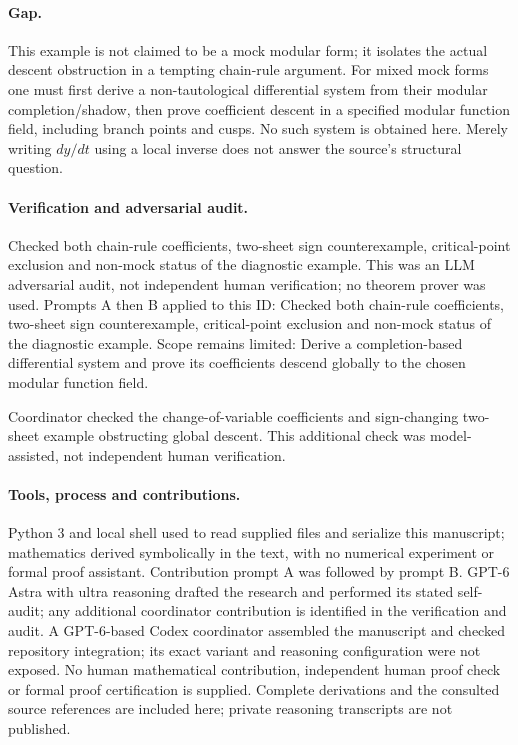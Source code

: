 \documentclass[11pt]{article}
\begin{document}
\paragraph{Gap.}This example is not claimed to be a mock modular form; it isolates the actual descent obstruction in a tempting chain-rule argument. For mixed mock forms one must first derive a non-tautological differential system from their modular completion/shadow, then prove coefficient descent in a specified modular function field, including branch points and cusps. No such system is obtained here. Merely writing \(dy/dt\) using a local inverse does not answer the source's structural question.

\paragraph{Verification and adversarial audit.}
Checked both chain-rule coefficients, two-sheet sign counterexample, critical-point exclusion and non-mock status of the diagnostic example. This was an LLM adversarial audit, not independent human verification; no theorem prover was used. Prompts A then B applied to this ID: Checked both chain-rule coefficients, two-sheet sign counterexample, critical-point exclusion and non-mock status of the diagnostic example. Scope remains limited: Derive a completion-based differential system and prove its coefficients descend globally to the chosen modular function field.

Coordinator checked the change-of-variable coefficients and sign-changing two-sheet example obstructing global descent. This additional check was model-assisted, not independent human verification.

\paragraph{Tools, process and contributions.}
Python 3 and local shell used to read supplied files and serialize this manuscript; mathematics derived symbolically in the text, with no numerical experiment or formal proof assistant. Contribution prompt A was followed by prompt B. GPT-6 Astra with ultra reasoning drafted the research and performed its stated self-audit; any additional coordinator contribution is identified in the verification and audit. A GPT-6-based Codex coordinator assembled the manuscript and checked repository integration; its exact variant and reasoning configuration were not exposed. No human mathematical contribution, independent human proof check or formal proof certification is supplied. Complete derivations and the consulted source references are included here; private reasoning transcripts are not published.
\end{document}
